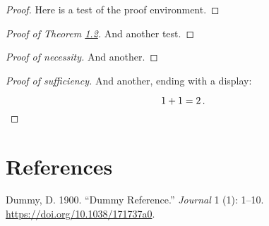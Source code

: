 \documentclass[
  letterpaper,
  DIV=11,
  numbers=noendperiod]{scrartcl}
\newlength{\cslhangindent}
\newlength{\cslentryspacingunit} %
\newenvironment{CSLReferences}[2] %
 {%
  \setlength{\parindent}{0pt}
  \ifodd #1
  \let\oldpar\par
  \def\par{\hangindent=\cslhangindent\oldpar}
  \fi
  \setlength{\parskip}{#2\cslentryspacingunit}
 }%
 {}
\theoremstyle{plain}
\theoremstyle{plain}
\theoremstyle{plain}
\theoremstyle{plain}
\theoremstyle{plain}
\theoremstyle{exercise}
\theoremstyle{note}
\theoremstyle{break}
\theoremstyle{citing}
\begin{document}
\begin{proof}

Here is a test of the proof environment.

\end{proof}

\begin{proof}[Proof of Theorem \protect\hyperlink{pigspan}{1.2}]

And another test.

\end{proof}

\begin{proof}[Proof of \emph{necessity}]

And another.

\end{proof}

\begin{proof}[Proof of \emph{sufficiency}]

And another, ending with a display:

\[1+1=2\,. \qedhere\]

\end{proof}

\hypertarget{references}{%
\section*{References}\label{references}}

\hypertarget{refs}{}
\begin{CSLReferences}{1}{0}
\leavevmode{}%
Dummy, D. 1900. {``Dummy Reference.''} \emph{Journal} 1 (1): 1--10.
\url{https://doi.org/10.1038/171737a0}.

\end{CSLReferences}
\end{document}
